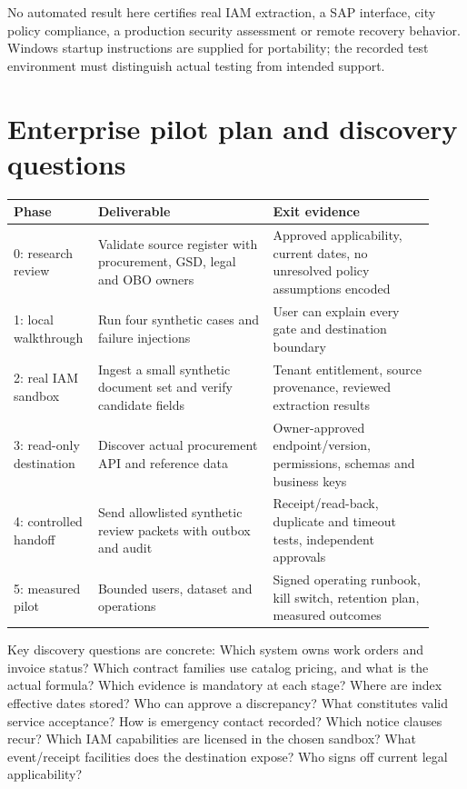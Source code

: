 \documentclass[11pt,letterpaper]{article}
\begin{document}
No automated result here certifies real IAM extraction, a SAP interface, city policy compliance, a production security assessment or remote recovery behavior. Windows startup instructions are supplied for portability; the recorded test environment must distinguish actual testing from intended support.

\section{Enterprise pilot plan and discovery questions}
\begin{longtable}{p{0.15\linewidth}p{0.40\linewidth}p{0.37\linewidth}}
\toprule Phase & Deliverable & Exit evidence\\\midrule
0: research review & Validate source register with procurement, GSD, legal and OBO owners & Approved applicability, current dates, no unresolved policy assumptions encoded\\
1: local walkthrough & Run four synthetic cases and failure injections & User can explain every gate and destination boundary\\
2: real IAM sandbox & Ingest a small synthetic document set and verify candidate fields & Tenant entitlement, source provenance, reviewed extraction results\\
3: read-only destination & Discover actual procurement API and reference data & Owner-approved endpoint/version, permissions, schemas and business keys\\
4: controlled handoff & Send allowlisted synthetic review packets with outbox and audit & Receipt/read-back, duplicate and timeout tests, independent approvals\\
5: measured pilot & Bounded users, dataset and operations & Signed operating runbook, kill switch, retention plan, measured outcomes\\
\bottomrule
\end{longtable}

Key discovery questions are concrete: Which system owns work orders and invoice status? Which contract families use catalog pricing, and what is the actual formula? Which evidence is mandatory at each stage? Where are index effective dates stored? Who can approve a discrepancy? What constitutes valid service acceptance? How is emergency contact recorded? Which notice clauses recur? Which IAM capabilities are licensed in the chosen sandbox? What event/receipt facilities does the destination expose? Who signs off current legal applicability?
\end{document}
